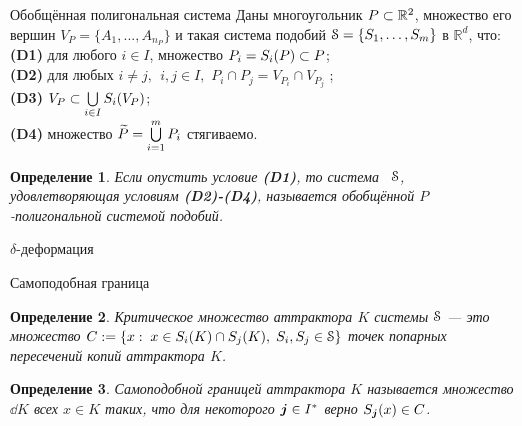 \documentclass[aspectratio=1610, 10pt, notheorems]{beamer}
\newtheorem{definition}  {Определение}
\begin{document}
\begin{frame}{Обобщённая полигональная система}
Даны многоугольник $P\subset \mathbb R^2$, множество его вершин $V_P=\{A_1,...,A_{n_P}\}$  и такая система подобий ${\EuScript S} = \{S_1, \ldots, S_m\}$ в $\mathbb R^d$, что:\\
{\bf(D1)}  для любого $i\in I$, множество $P_i=S_i(P)\subset P$;\\
{\bf(D2)}  для любых $i\neq j,\ \   i, j \in I,$ $P_i \cap P_j=V_{P_i}\cap V_{P_j}$ ;\\
{\bf(D3)}  $V_P\subset \bigcup\limits_{i\in I}S_i(V_P)$;\\
{\bf(D4)}  множество    ${{\widetilde P}} = \bigcup \limits_{i = 1}^m P_i$ стягиваемо.
\begin{definition}	
Если опустить условие {\bf (D1)}, то система \ ${\EuScript S} $, удовлетворяющая условиям {\bf (D2)-(D4)},
называется  обобщённой $P$-полигональной  системой подобий.
\end{definition}
\end{frame}


\begin{frame}{$\delta$-деформация}

\end{frame}


\begin{frame}{}

\end{frame}


\begin{frame}{}

\end{frame}


\begin{frame}{}

\end{frame}


\begin{frame}{}

\end{frame}


\begin{frame}{}

\end{frame}


\begin{frame}{}

\end{frame}


\begin{frame}{Самоподобная граница}
\begin{definition}
{\em Критическое множество} аттрактора $K$ системы ${\EuScript S}$ --- это множество $C:=\{x:\; x\in S_i(K)\cap S_j(K),\; S_i, S_j\in{\EuScript S}\}$ точек попарных пересечений копий аттрактора $K$.
\end{definition}
\begin{definition}
{\em Самоподобной границей} аттрактора $K$ называется множество $\dd K$ всех $x\in K$ таких, что для некоторого ${\bm{j}}\in I^*$ верно $S_{\bm{j}}(x)\in C$.
\end{definition}
\end{frame}
\end{document}
